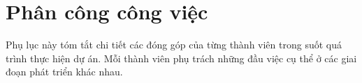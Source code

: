 \chapter{Phân công công việc}

Phụ lục này tóm tắt chi tiết các đóng góp của từng thành viên trong suốt quá trình thực hiện dự án.
Mỗi thành viên phụ trách những đầu việc cụ thể ở các giai đoạn phát triển khác nhau.


